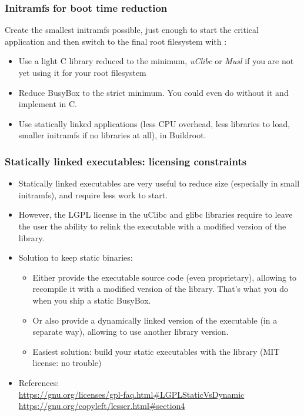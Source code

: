 \begin{frame}
\frametitle{Initramfs for boot time reduction}
Create the smallest initramfs possible, just enough to start the critical
application and then switch to the final root filesystem with
:
\begin{itemize}
\item Use a light C library reduced to the minimum,
      {\em uClibc} or {\em Musl} if you are not yet using it for
      your root filesystem
\item Reduce BusyBox to the strict minimum.
      You could even do without it and implement  in C.
\item Use statically linked applications (less CPU overhead, less
      libraries to load, smaller initramfs if no libraries at all),
       in Buildroot.
\end{itemize}
\end{frame}

\begin{frame}
\frametitle{Statically linked executables: licensing constraints}
\begin{itemize}
\item Statically linked executables are very useful to reduce size
      (especially in small initramfs), and require less work to start.
\item However, the LGPL license in the uClibc and glibc libraries
      require to leave the user the ability to relink the executable
      with a modified version of the library.
\item Solution to keep static binaries:
      \begin{itemize}
      \item Either provide the executable source code (even
            proprietary), allowing to recompile it with a modified
            version of the library. That's what you do when
            you ship a static BusyBox.
      \item Or also provide a dynamically linked version of the
	    executable (in a separate way), allowing to use another
            library version.
      \item Easiest solution: build your static executables with the
	     library (MIT license: no trouble)
      \end{itemize}
\item References: \\
      {\footnotesize
      \url{https://gnu.org/licenses/gpl-faq.html\#LGPLStaticVsDynamic} \\
      \url{https://gnu.org/copyleft/lesser.html\#section4}
      }
\end{itemize}
\end{frame}


